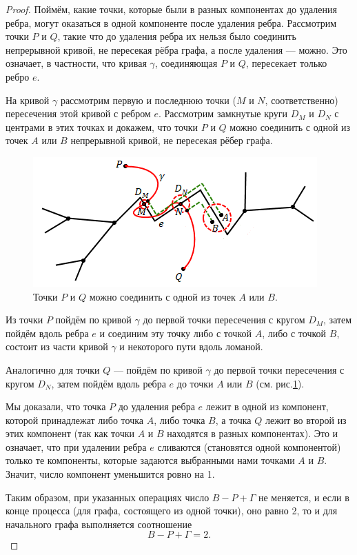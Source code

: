 \begin{proof}
    Поймём, какие точки, которые были в разных компонентах до удаления ребра, могут оказаться в одной компоненте после удаления ребра. Рассмотрим точки $P$ и $Q$, такие что до удаления ребра их нельзя было соединить непрерывной кривой, не пересекая рёбра графа, а после удаления — можно. Это означает, в частности, что кривая $\gamma$, соединяющая $P$ и $Q$, пересекает только ребро $e$.

    На кривой $\gamma$ рассмотрим первую и последнюю точки ($M$ и $N$, соответственно) пересечения этой кривой с ребром $e$. Рассмотрим замкнутые круги $D_M$ и $D_N$ с центрами в этих точках и докажем, что точки $P$ и $Q$ можно соединить с одной из точек $A$ или $B$ непрерывной кривой, не пересекая рёбер графа.

    \begin{figure}[h]
        \centering
        \includegraphics[scale=0.8]{images/c6.3.png}
        \caption{Точки $P$ и $Q$ можно соединить с одной из точек $A$ или $B$.}
        \label{fig:c6.3}
    \end{figure}

    Из точки $P$ пойдём по кривой $\gamma$ до первой точки пересечения с кругом $D_M$, затем пойдём вдоль ребра $e$ и соединим эту точку либо с точкой $A$, либо с точкой $B$, состоит из части кривой $\gamma$ и некоторого пути вдоль ломаной.

    Аналогично для точки $Q$ — пойдём по кривой $\gamma$ до первой точки пересечения с кругом $D_N$, затем пойдём вдоль ребра $e$ до точки $A$ или $B$ (см. рис.\ref{fig:c6.3}).

    Мы доказали, что точка $P$ до удаления ребра $e$ лежит в одной из компонент, которой принадлежат либо точка $A$, либо точка $B$, а точка $Q$ лежит во второй из этих компонент (так как точки $A$ и $B$ находятся в разных компонентах). Это и означает, что при удалении ребра $e$ сливаются (становятся одной компонентой) только те компоненты, которые задаются выбранными нами точками $A$ и $B$. Значит, число компонент уменьшится ровно на 1.

    Таким образом, при указанных операциях число $B - P + \Gamma$ не меняется, и если в конце процесса (для графа, состоящего из одной точки), оно равно 2, то и для начального графа выполняется соотношение
    \[B - P + \Gamma = 2.\]
\end{proof}


